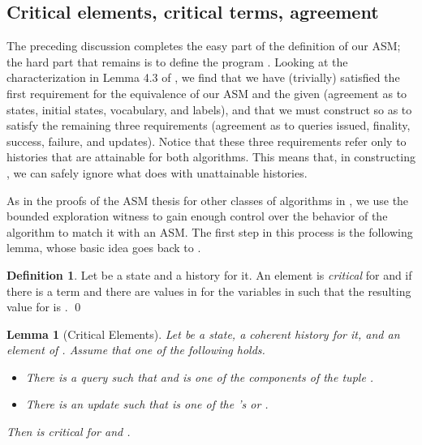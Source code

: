 \documentclass{LMCS}
\newtheorem{la}[thm]{Lemma}
\theoremstyle{definition}
\newtheorem{df}[thm]{Definition}
\newenvironment{ls}{\begin{itemize}}{\end{itemize}}
\begin{document}
\subsection{Critical elements, critical terms, agreement}

The preceding discussion completes the easy part of the definition
of our ASM; the hard part that remains is to define the program
. Looking at the characterization in Lemma 4.3 of \cite{ga1},
we find that we have (trivially) satisfied the first requirement for
the equivalence of our ASM and the given  (agreement as to
states, initial states, vocabulary, and labels), and that we must
construct  so as to satisfy the remaining three requirements
(agreement as to queries issued, finality, success, failure, and
updates).  Notice that these three requirements refer only to
histories that are attainable for both algorithms.  This means that,
in constructing , we can safely ignore what  does with
unattainable histories.

As in the proofs of the ASM thesis for other classes of algorithms in
\cite{seqth, parth, oa3}, we use the bounded exploration witness to gain
enough control over the behavior of the algorithm  to match it with
an ASM.  The first step in this process is the following lemma, whose
basic idea goes back to \cite{seqth}.

\begin{df}
  Let  be a state and  a history for it.  An element 
  is \emph{critical} for  and  if there is a term  and
  there are values in  for the variables in  such
  that the resulting value for  is .
\qed\end{df}

\begin{la}[Critical Elements]    \label{crit-la}
Let  be a state,  a coherent history for it, and  an
element of . Assume that one of the following holds.
\begin{ls}
  \item There is a query  such that  and  is one
  of the components of the tuple .
  \item There is an update 
  such that  is one of the 's or .
\end{ls}
Then  is critical for  and .
\end{la}
\end{document}
